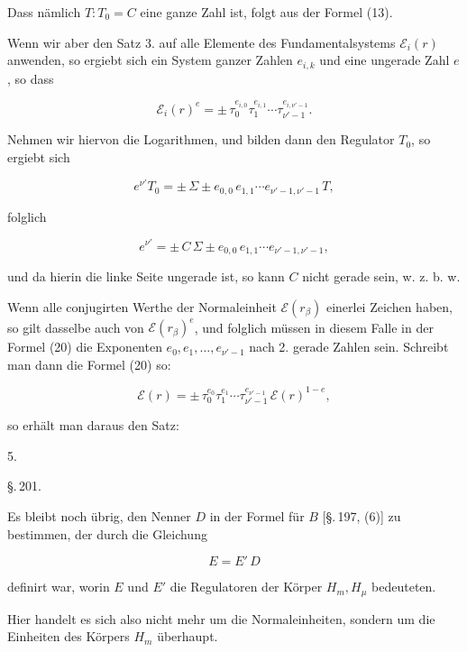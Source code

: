 
Dass nämlich $T:T_0 = C$ eine ganze Zahl ist, folgt aus der Formel (13).

Wenn wir aber den Satz 3. auf alle Elemente des Fundamentalsystems $\mathcal{E}_i(r)$ anwenden, so ergiebt sich ein System ganzer Zahlen $e_{i,k}$ und eine ungerade Zahl $e$, so dass

\[
\mathcal{E}_i(r)^e = \pm\, \tau_0^{e_{i,0}}\tau_1^{e_{i,1}} \cdots \tau_{\nu'-1}^{e_{i,\nu'-1}}.
\]

Nehmen wir hiervon die Logarithmen, und bilden dann den Regulator $T_0$, so ergiebt sich

\[
e^{\nu'} T_0 = \pm\, \Sigma \pm e_{0,0}\, e_{1,1} \cdots e_{\nu'-1,\nu'-1}\, T,
\]

folglich

\[
e^{\nu'} = \pm\, C\, \Sigma \pm e_{0,0}\, e_{1,1} \cdots e_{\nu'-1,\nu'-1},
\]

und da hierin die linke Seite ungerade ist, so kann $C$ nicht gerade sein, w. z. b. w.

Wenn alle conjugirten Werthe der Normaleinheit $\mathcal{E}(r_\beta)$ einerlei Zeichen haben, so gilt dasselbe auch von $\mathcal{E}(r_\beta)^e$, und folglich müssen in diesem Falle in der Formel (20) die Exponenten $e_0, e_1, \ldots, e_{\nu'-1}$ nach 2. gerade Zahlen sein. Schreibt man dann die Formel (20) so:

\[
\mathcal{E}(r) = \pm\, \tau_0^{e_0}\tau_1^{e_1} \cdots \tau_{\nu'-1}^{e_{\nu'-1}}\, \mathcal{E}(r)^{1-e},
\]

so erhält man daraus den Satz:

5. 

\begin{center}
\S.\,201.

\end{center}

Es bleibt noch übrig, den Nenner $D$ in der Formel für $B$ [\S.\,197, (6)] zu bestimmen, der durch die Gleichung

\[
E = E'\, D
\]

definirt war, worin $E$ und $E'$ die Regulatoren der Körper $H_m, H_\mu$ bedeuteten.

Hier handelt es sich also nicht mehr um die Normaleinheiten, sondern um die Einheiten des Körpers $H_m$ überhaupt.
